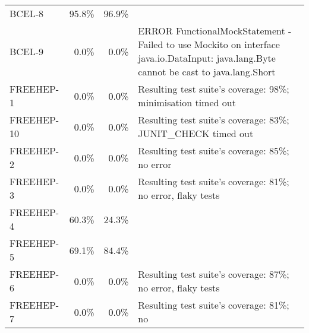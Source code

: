 \begin{tabular}{ l rrrrrrr rrrrrrrr}
BCEL-8 & 95.8\% & 96.9\%\\ 
BCEL-9 & \cellcolor{light-gray} \textcolor{black}{0.0}\% &
                                                           \cellcolor{light-gray}
                                                           \textcolor{black}{0.0}\%
 & \multicolumn{13}{l}{ERROR FunctionalMockStatement - Failed to use Mockito on interface java.io.DataInput: java.lang.Byte cannot be cast to java.lang.Short}\\ 
FREEHEP-1 & \cellcolor{light-gray} \textcolor{black}{0.0}\% &
                                                              \cellcolor{light-gray}
                                                              \textcolor{black}{0.0}\%
 & \multicolumn{13}{l}{Resulting test suite's coverage: 98\%;
   minimisation timed out}\\ 
FREEHEP-10 & \cellcolor{light-gray} \textcolor{black}{0.0}\% &
                                                               \cellcolor{light-gray}
                                                               \textcolor{black}{0.0}\%
 & \multicolumn{13}{l}{Resulting test suite's coverage: 83\%;
   JUNIT\_CHECK timed out}\\ 
FREEHEP-2 & \cellcolor{light-gray} \textcolor{black}{0.0}\% &
                                                              \cellcolor{light-gray}
                                                              \textcolor{black}{0.0}\%
&  \multicolumn{13}{l}{Resulting test suite's coverage: 85\%; no error} \\ 
FREEHEP-3 & \cellcolor{light-gray} \textcolor{black}{0.0}\% &
                                                              \cellcolor{light-gray}
                                                              \textcolor{black}{0.0}\%
 &  \multicolumn{13}{l}{Resulting test suite's coverage: 81\%; no
   error, flaky tests}\\ 
FREEHEP-4 & 60.3\% & 24.3\%\\ 
FREEHEP-5 & 69.1\% & 84.4\%\\ 
FREEHEP-6 & \cellcolor{light-gray} \textcolor{black}{0.0}\% &
                                                              \cellcolor{light-gray}
                                                              \textcolor{black}{0.0}\%
  &  \multicolumn{13}{l}{Resulting test suite's coverage: 87\%; no
   error, flaky tests}\\
FREEHEP-7 & \cellcolor{light-gray} \textcolor{black}{0.0}\% &
                                                              \cellcolor{light-gray} \textcolor{black}{0.0}\%   &  \multicolumn{13}{l}{Resulting test suite's coverage: 81\%; no
}
\end{tabular}
